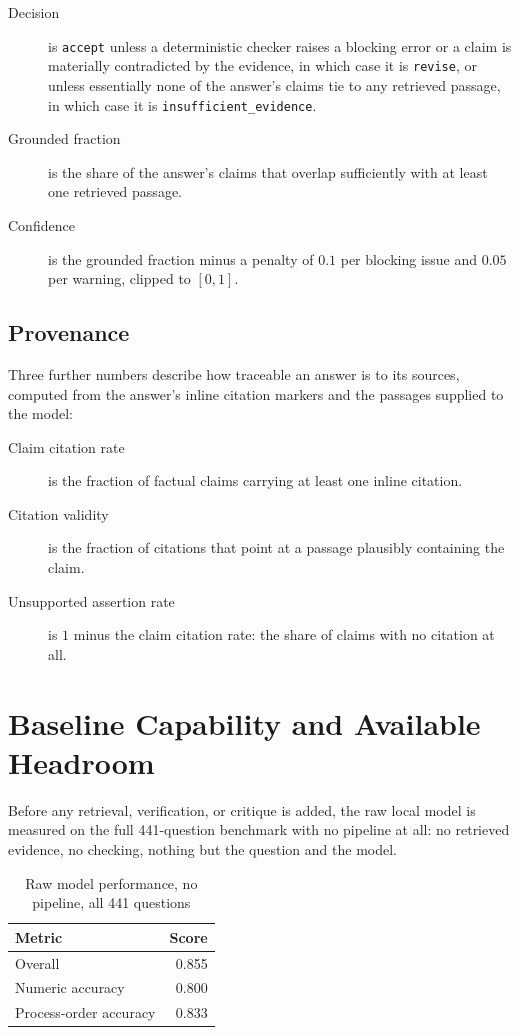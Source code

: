 \begin{description}
\item[Decision] is \texttt{accept} unless a deterministic checker raises a
blocking error or a claim is materially contradicted by the evidence, in
which case it is \texttt{revise}, or unless essentially none of the
answer's claims tie to any retrieved passage, in which case it is
\texttt{insufficient\_evidence}.
\item[Grounded fraction] is the share of the answer's claims that overlap
sufficiently with at least one retrieved passage.
\item[Confidence] is the grounded fraction minus a penalty of $0.1$ per
blocking issue and $0.05$ per warning, clipped to $[0,1]$.
\end{description}

\subsection*{Provenance}

Three further numbers describe how traceable an answer is to its sources,
computed from the answer's inline citation markers and the passages
supplied to the model:

\begin{description}
\item[Claim citation rate] is the fraction of factual claims carrying at
least one inline citation.
\item[Citation validity] is the fraction of citations that point at a
passage plausibly containing the claim.
\item[Unsupported assertion rate] is $1$ minus the claim citation rate:
the share of claims with no citation at all.
\end{description}

\section{Baseline Capability and Available Headroom}\label{4.3}

Before any retrieval, verification, or critique is added, the raw local
model is measured on the full 441-question benchmark with no pipeline at
all: no retrieved evidence, no checking, nothing but the question and the
model.

\begin{table}[h]
\centering
\caption{Raw model performance, no pipeline, all 441 questions}
\label{tab:4.1}
\begin{tabular}{@{}lr@{}}
\toprule
\textbf{Metric} & \textbf{Score} \\
\midrule
Overall & 0.855 \\
Numeric accuracy & 0.800 \\
Process-order accuracy & 0.833 \\
\bottomrule
\end{tabular}
\end{table}

